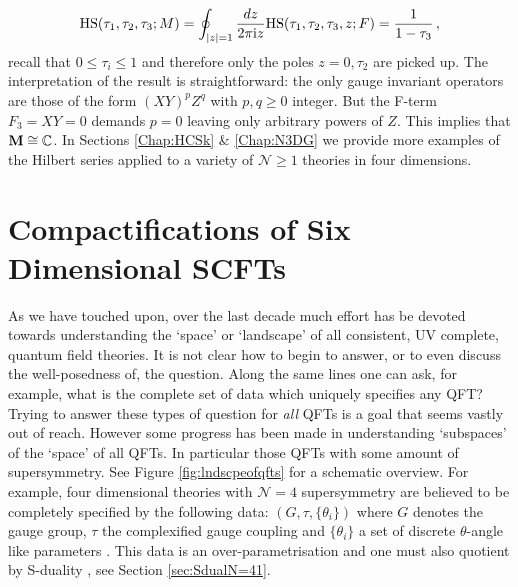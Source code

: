 \documentclass[main.tex]{subfiles}
\begin{document}
\begin{equation}
\textrm{HS}(\tau_1,\tau_2,\tau_3;M)=\oint_{|z|=1}\frac{dz}{2\pi\mathrm{i} z}\textrm{HS}(\tau_1,\tau_2,\tau_3,z;F)=\frac{1}{1-\tau_3}\,,
\end{equation}
recall that $0\leq\tau_i\leq1$ and therefore only the poles $z=0,\tau_2$ are picked up.  The interpretation of the result is straightforward: the only gauge invariant operators are those of the form $(XY)^pZ^q$ with $p,q\geq0$ integer.  But the F-term $F_3=XY=0$ demands $p=0$ leaving only arbitrary powers of $Z$.  This implies that $\mathbf{M}\cong\mathbb{C}$.
In Sections \ref{Chap:HCSk} \& \ref{Chap:N3DG} we provide more examples of the Hilbert series applied to a variety of $\mathcal{N}\geq1$ theories in four dimensions.

\section{Compactifications of Six Dimensional SCFTs}
As we have touched upon, over the last decade much effort has be devoted towards understanding the `space' or `landscape' of all consistent, UV complete, quantum field theories.  It is not clear how to begin to answer, or to even discuss the well-posedness of, the question.  Along the same lines one can ask, for example, what is the complete set of data which uniquely specifies any QFT?
Trying to answer these types of question for \textit{all} QFTs is a goal that seems vastly out of reach.  However some progress has been made in understanding `subspaces' of the `space' of all QFTs.  In particular those QFTs with some amount of supersymmetry.  See Figure \ref{fig:lndscpeofqfts} for a schematic overview.  For example, four dimensional theories with $\mathcal{N}=4$ supersymmetry are believed to be completely specified by the following data: $(G,\tau,\{\theta_i\})$ where $G$ denotes the gauge group, $\tau$ the complexified gauge coupling and $\{\theta_i\}$ a set of discrete $\theta$-angle like parameters \cite{Aharony:2013hda}.  This data is an over-parametrisation and one must also quotient by S-duality \cite{MONTONEN1977117,GNO}, see Section \ref{sec:SdualN=41}.
\end{document}
